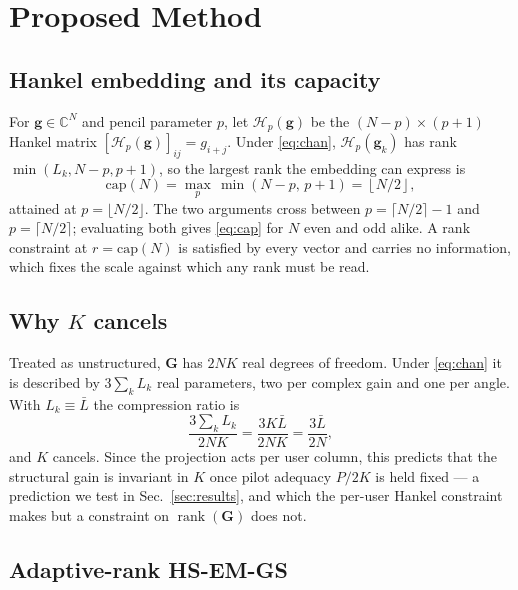 \documentclass[journal]{IEEEtran}
\DeclareMathOperator{\rank}{rank}
\newcommand{\bG}{\mathbf{G}}
\newcommand{\bg}{\mathbf{g}}
\newcommand{\Hank}{\mathcal{H}}
\begin{document}
\section{Proposed Method}
\label{sec:method}

\subsection{Hankel embedding and its capacity}

For $\bg\in\mathbb{C}^{N}$ and pencil parameter $p$, let $\Hank_p(\bg)$ be the
$(N-p)\times(p+1)$ Hankel matrix $[\Hank_p(\bg)]_{ij}=g_{i+j}$. Under
\eqref{eq:chan}, $\Hank_p(\bg_k)$ has rank $\min(L_k,N-p,p+1)$, so the largest
rank the embedding can express is
\begin{equation}
\mathrm{cap}(N)=\max_{p}\,\min(N-p,\,p+1)=\left\lfloor N/2 \right\rfloor ,
\label{eq:cap}
\end{equation}
attained at $p=\lfloor N/2\rfloor$. The two arguments cross between
$p=\lceil N/2\rceil-1$ and $p=\lceil N/2\rceil$; evaluating both gives
\eqref{eq:cap} for $N$ even and odd alike. A rank constraint at
$r=\mathrm{cap}(N)$ is satisfied by every vector and carries no information,
which fixes the scale against which any rank must be read.

\subsection{Why $K$ cancels}

Treated as unstructured, $\bG$ has $2NK$ real degrees of freedom. Under
\eqref{eq:chan} it is described by $3\sum_k L_k$ real parameters, two per
complex gain and one per angle. With $L_k\equiv\bar{L}$ the compression ratio
is
\begin{equation}
\frac{3\sum_k L_k}{2NK}=\frac{3K\bar{L}}{2NK}=\frac{3\bar{L}}{2N},
\label{eq:compress}
\end{equation}
and $K$ cancels. Since the projection acts per user column, this predicts that
the structural gain is invariant in $K$ once pilot adequacy $P/2K$ is held
fixed --- a prediction we test in Sec.~\ref{sec:results}, and which the
per-user Hankel constraint makes but a constraint on $\rank(\bG)$ does not.

\subsection{Adaptive-rank HS-EM-GS}
\end{document}
